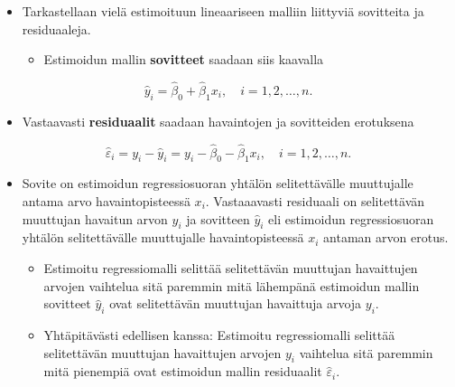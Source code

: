 \documentclass[
]{book}
\providecommand{\tightlist}{%
  \setlength{\itemsep}{0pt}\setlength{\parskip}{0pt}}
\begin{document}
\hfill\break

\begin{itemize}
\tightlist
\item
  Tarkastellaan vielä estimoituun lineaariseen malliin liittyviä sovitteita ja residuaaleja.

  \begin{itemize}
  \tightlist
  \item
    Estimoidun mallin \textbf{sovitteet} saadaan siis kaavalla
  \end{itemize}
\end{itemize}

\[
\widehat{y}_i = \widehat{\beta}_0 + \widehat{\beta}_1 x_i, \quad i=1,2,\ldots,n.
\]

\begin{itemize}
\tightlist
\item
  Vastaavasti \textbf{residuaalit} saadaan havaintojen ja sovitteiden erotuksena
\end{itemize}

\[
\widehat{\varepsilon}_i = y_i - \widehat{y}_i = y_i - \widehat{\beta}_0 - \widehat{\beta}_1 x_i, \quad i=1,2,\ldots,n.
\]

\begin{itemize}
\tightlist
\item
  Sovite on estimoidun regressiosuoran yhtälön selitettävälle muuttujalle antama arvo havaintopisteessä \(x_i\). Vastaaavasti residuaali on selitettävän muuttujan havaitun arvon \(y_i\) ja sovitteen \(\widehat{y}_i\) eli estimoidun regressiosuoran yhtälön selitettävälle muuttujalle havaintopisteessä \(x_i\) antaman arvon erotus.

  \begin{itemize}
  \tightlist
  \item
    Estimoitu regressiomalli selittää selitettävän muuttujan havaittujen arvojen vaihtelua sitä paremmin mitä lähempänä estimoidun mallin sovitteet \(\widehat{y}_i\) ovat selitettävän muuttujan havaittuja arvoja \(y_i\).
  \item
    Yhtäpitävästi edellisen kanssa: Estimoitu regressiomalli selittää selitettävän muuttujan havaittujen arvojen \(y_i\) vaihtelua sitä paremmin mitä pienempiä ovat estimoidun mallin residuaalit \(\widehat{\varepsilon}_i\).
  \end{itemize}
\end{itemize}

\hfill\break
\end{document}
